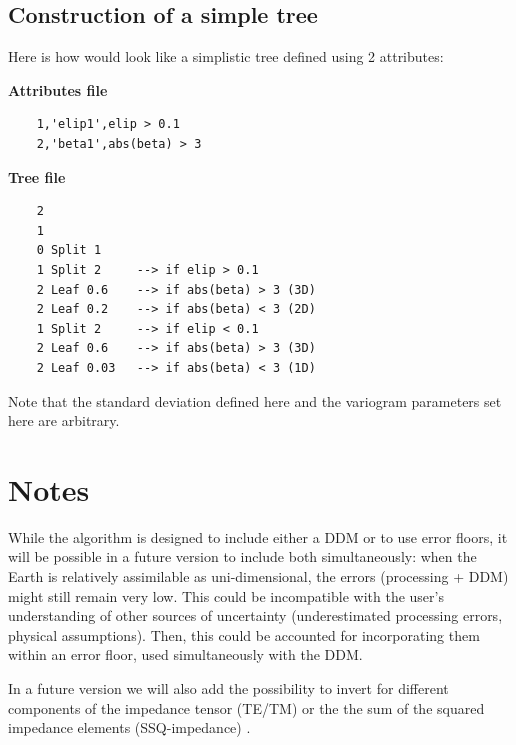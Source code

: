 \documentclass[]{scrartcl}
\begin{document}
    
    \subsection{Construction of a simple tree}
    
    Here is how would look like a simplistic tree defined using 2 attributes:
    \bigbreak
    
    \textbf{Attributes file}
    
    \begin{verbatim}
	1,'elip1',elip > 0.1
	2,'beta1',abs(beta) > 3
    \end{verbatim} 


    \textbf{Tree file}

	\begin{verbatim}
	2               
	1
	0 Split 1
	1 Split 2     --> if elip > 0.1    
	2 Leaf 0.6    --> if abs(beta) > 3 (3D)
	2 Leaf 0.2    --> if abs(beta) < 3 (2D)
	1 Split 2     --> if elip < 0.1
	2 Leaf 0.6    --> if abs(beta) > 3 (3D)
	2 Leaf 0.03   --> if abs(beta) < 3 (1D)
	\end{verbatim} 
	
	
	Note that the standard deviation defined here and the variogram parameters set here are arbitrary. 



    \section{Notes}
    
    While the algorithm is designed to include either a DDM or to use error floors, it will be possible in a future version to include both simultaneously: when the Earth is relatively assimilable as uni-dimensional, the errors (processing + DDM) might still remain very low. This could be incompatible with the user's understanding of other sources of uncertainty (underestimated processing errors, physical assumptions). Then, this could be accounted for incorporating them within an error floor, used simultaneously with the DDM. 
    
    In a future version we will also add the possibility to invert for different components of the impedance tensor (TE/TM) or the the sum of the squared impedance elements (SSQ-impedance) \citep[see][]{Rung-Arunwan2016}.

	
	

	
\end{document}
